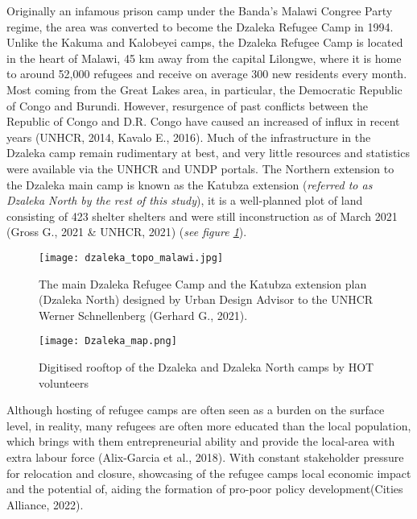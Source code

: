 \documentclass[11pt, a4paper, twoside]{report}
\begin{document}
Originally an infamous prison camp under the Banda's Malawi Congree Party regime, the area was converted to become the Dzaleka Refugee Camp in 1994. Unlike the Kakuma and Kalobeyei camps, the Dzaleka Refugee Camp is located in the heart of Malawi, 45 km away from the capital Lilongwe, where it is home to around 52,000 refugees and receive on average 300 new residents every month. Most coming from the Great Lakes area, in particular, the Democratic Republic of Congo and Burundi. However, resurgence of past conflicts between the Republic of Congo and D.R. Congo have caused an increased of influx in recent years (UNHCR, 2014, Kavalo E., 2016). Much of the infrastructure in the Dzaleka camp remain rudimentary at best, and very little resources and statistics were available via the UNHCR and UNDP portals. The Northern extension to the Dzaleka main camp is known as the Katubza extension (\textit{referred to as Dzaleka North by the rest of this study}), it is a well-planned plot of land consisting of 423 shelter shelters and were still inconstruction as of March 2021 (Gross G., 2021 \& UNHCR, 2021) (\textit{see figure \ref{fig:DZ_KA_PLAN}}).\\\par

\begin{figure}[H]
  \centering
  \texttt{[image: dzaleka\_topo\_malawi.jpg]}
  \caption{The main Dzaleka Refugee Camp and the Katubza extension plan (Dzaleka North) designed by Urban Design Advisor to the UNHCR Werner Schnellenberg (Gerhard G., 2021).}
\label{fig:DZ_KA_PLAN}
\end{figure}

\begin{figure}[H]
  \centering
  \texttt{[image: Dzaleka\_map.png]}
  \caption{Digitised rooftop of the Dzaleka and Dzaleka North camps by HOT volunteers}
\label{fig:Overview_DZK}
\end{figure}

Although hosting of refugee camps are often seen as a burden on the surface level, in reality, many refugees are often more educated than the local population, which brings with them entrepreneurial ability and provide the local-area with extra labour force (Alix-Garcia et al., 2018). With constant stakeholder pressure for relocation and closure, showcasing of the refugee camps local economic impact and the potential of, aiding the formation of pro-poor policy development(Cities Alliance, 2022).

\newpage
\end{document}
